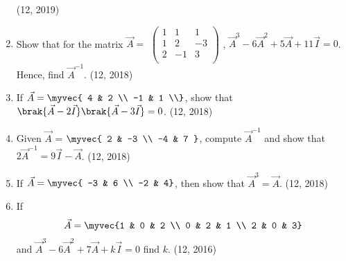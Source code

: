 \begin{enumerate}[label=\thesubsection.\arabic*,ref=\thesubsection.\theenumi]
\hfill (12, 2019)
\item Show that for the matrix $\vec{A}=$ $\begin{pmatrix}
  1 & 1 &  1 \\
  1 & 2 & -3 \\
  2 & -1 & 3 \\
\end{pmatrix}$ , ${\vec{A}}^3 - 6{\vec{A}}^2 + 5{\vec{A}} +11 \vec{I} = 0$.\\
Hence,  find ${\vec{A}}^{-1}$.
\hfill (12, 2018)
\item If $\vec{A}= \myvec{ 4 & 2 \\ -1 & 1 \\}$, show that $\brak{\vec{A}-2\vec{I}}\brak{\vec{A}-3\vec{I}}=0$.
\hfill (12, 2018)
\item Given $\vec{A}$ = $\myvec{ 2 & -3 \\ -4 & 7 }$, compute $\vec{A}^{-1}$ and show that $2\vec{A}^{-1} = 9\vec{I}-\vec{A}$.
\hfill (12, 2018)
\item If $\vec{A}=\myvec{ -3 & 6 \\ -2 & 4}$, then show that ${\vec{A}}^3=\vec{A}$.
\hfill (12, 2018)
    \item If
          \begin{align*}
              \vec{A} = \myvec{1 & 0 & 2  \\
              0            & 2 & 1  \\
              2            & 0 & 3}
          \end{align*}
          and $\vec{A}^3-6\vec{A}^2+7\vec{A}+k\vec{I}=0$ find $k$.
\hfill (12, 2016)
\end{enumerate}
